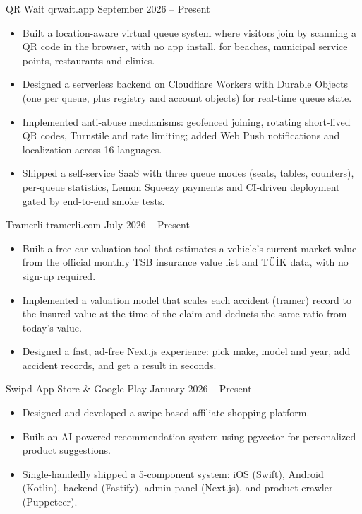 \resumeProject
  {QR Wait}
  {qrwait.app}
  {}
  {September 2026 -- Present}
\begin{itemize}
  \item Built a location-aware virtual queue system where visitors join by scanning a QR code in the browser, with no app install, for beaches, municipal service points, restaurants and clinics.
  \item Designed a serverless backend on Cloudflare Workers with Durable Objects (one per queue, plus registry and account objects) for real-time queue state.
  \item Implemented anti-abuse mechanisms: geofenced joining, rotating short-lived QR codes, Turnstile and rate limiting; added Web Push notifications and localization across 16 languages.
  \item Shipped a self-service SaaS with three queue modes (seats, tables, counters), per-queue statistics, Lemon Squeezy payments and CI-driven deployment gated by end-to-end smoke tests.
\end{itemize}
\vspace{0.25em}

\resumeProject
  {Tramerli}
  {tramerli.com}
  {}
  {July 2026 -- Present}
\begin{itemize}
  \item Built a free car valuation tool that estimates a vehicle's current market value from the official monthly TSB insurance value list and TÜİK data, with no sign-up required.
  \item Implemented a valuation model that scales each accident (tramer) record to the insured value at the time of the claim and deducts the same ratio from today's value.
  \item Designed a fast, ad-free Next.js experience: pick make, model and year, add accident records, and get a result in seconds.
\end{itemize}
\vspace{0.25em}

\resumeProject
  {Swipd}
  {App Store \& Google Play}
  {}
  {January 2026 -- Present}
\begin{itemize}
  \item Designed and developed a swipe-based affiliate shopping platform.
  \item Built an AI-powered recommendation system using pgvector for personalized product suggestions.
  \item Single-handedly shipped a 5-component system: iOS (Swift), Android (Kotlin), backend (Fastify), admin panel (Next.js), and product crawler (Puppeteer).
\end{itemize}
\vspace{0.25em}

